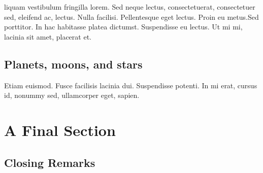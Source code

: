 \documentclass[centertitle]{notes}
\begin{document}
  \lipsum[10]
  \begin{note}
    liquam vestibulum fringilla lorem. Sed neque lectus, consectetuerat, consectetuer sed, eleifend ac, lectus. Nulla facilisi. Pellentesque eget lectus. Proin eu metus.Sed porttitor. In hac habitasse platea dictumst. Suspendisse eu lectus. Ut mi mi, lacinia sit amet, placerat et.
  \end{note}
  \lipsum[11]
  \begin{fig}%
  \end{fig}
  \lipsum[12-13]
  \subsection{Planets, moons, and stars}
  \lipsum[14]
  \begin{remark}
    Etiam euismod. Fusce facilisis lacinia dui. Suspendisse potenti. In mi erat, cursus id, nonummy sed, ullamcorper eget, sapien.
  \end{remark}
  \lipsum[14]


  \section{A Final Section}
  \lipsum[15]
  \subsection{Closing Remarks}
  \lipsum[16]

  
\end{document}
